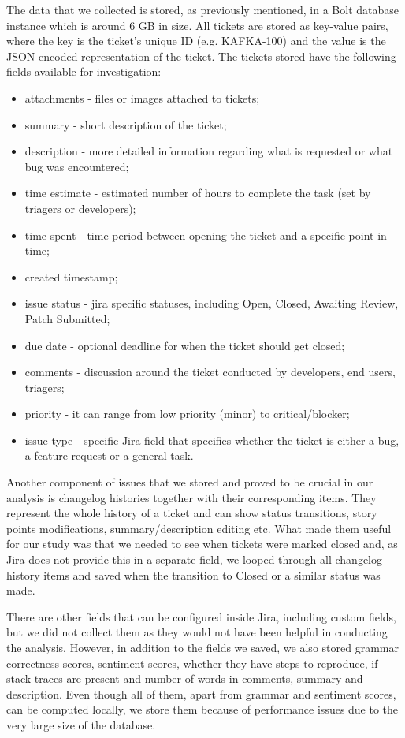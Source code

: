 \documentclass{mpaper}
\begin{document}
The data that we collected is stored, as previously mentioned, in a Bolt database instance which is around 6 GB in size. 
All tickets are stored as key-value pairs, where the key is the ticket's unique ID (e.g. KAFKA-100) and the value is the 
JSON encoded representation of the ticket. The tickets stored have the following fields available for investigation:
\begin{itemize}
  \item attachments - files or images attached to tickets;
  \item summary - short description of the ticket;
  \item description - more detailed information regarding what is requested or what bug was encountered;
  \item time estimate - estimated number of hours to complete the task (set by triagers or developers);
  \item time spent - time period between opening the ticket and a specific point in time;
  \item created timestamp;
  \item issue status - jira specific statuses, including Open, Closed, Awaiting Review, Patch Submitted;
  \item due date - optional deadline for when the ticket should get closed;
  \item comments - discussion around the ticket conducted by developers, end users, triagers;
  \item priority - it can range from low priority (minor) to critical/blocker;
  \item issue type - specific Jira field that specifies whether the ticket is either a bug, a feature request or a general task.
\end{itemize}

Another component of issues that we stored and proved to be crucial in our analysis is changelog histories together with their 
corresponding items. They represent the whole history of a ticket and can show status transitions, story points modifications, 
summary/description editing etc. What made them useful for our study was that we needed to see when tickets were marked closed and, 
as Jira does not provide this in a separate field, we looped through all changelog history items and saved when the transition to 
Closed or a similar status was made. 

There are other fields that can be configured inside Jira, including custom fields, but we did not collect them as they would not 
have been helpful in conducting the analysis. However, in addition to the fields we saved, we also stored grammar correctness scores, 
sentiment scores, whether they have steps to reproduce, if stack traces are present and number of words in comments, summary and description. 
Even though all of them, apart from grammar and sentiment scores, can be computed locally, we store them because of performance issues
due to the very large size of the database. 
\end{document}
